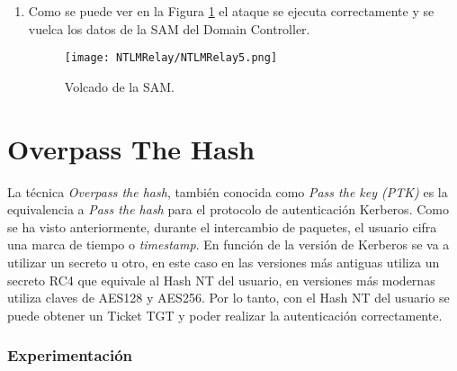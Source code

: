 \begin{enumerate}
\item Como se puede ver en la Figura \ref{NTLMRelay5} el ataque se ejecuta correctamente y se vuelca los datos de la SAM del Domain Controller. 
\begin{figure}[H] %
\begin{center}
\texttt{[image: NTLMRelay/NTLMRelay5.png]}
\end{center}
\caption{Volcado de la SAM.}
\label{NTLMRelay5}
\end{figure}

\end{enumerate}

\section{Overpass The Hash}

La técnica {\it Overpass the hash}, también conocida como {\it Pass the key (PTK)} es la equivalencia a {\it Pass the hash} para el protocolo de autenticación Kerberos. Como se ha visto anteriormente, durante el intercambio de paquetes, el usuario cifra una marca de tiempo o {\it timestamp}. En función de la versión de Kerberos se va a utilizar un secreto u otro, en este caso en las versiones más antiguas utiliza un secreto RC4 que equivale al Hash NT del usuario, en versiones más modernas utiliza claves de AES128 y AES256. Por lo tanto, con el Hash NT del usuario se puede obtener un Ticket TGT y poder realizar la autenticación correctamente. \\

\subsubsection{Experimentación}

